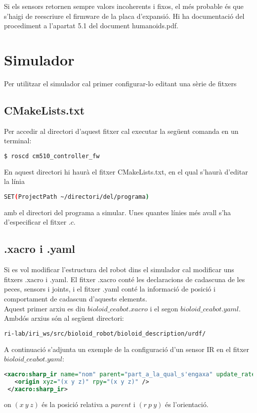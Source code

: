 \documentclass{article}
\begin{document}
Si els sensors retornen sempre valors incoherents i fixos, el més probable és que s'haigi de reescriure el firmware de la placa d'expansió. Hi ha documentació del procediment a l'apartat 5.1 del document humanoids.pdf.

\section{Simulador}
Per utilitzar el simulador cal primer configurar-lo editant una sèrie de 
fitxers
\subsection{CMakeLists.txt}
Per accedir al directori d'aquest fitxer cal executar la següent comanda en un terminal:
\begin{lstlisting}[language=bash]
$ roscd cm510_controller_fw
\end{lstlisting}
En aquest directori hi haurà el fitxer CMakeLists.txt, en el qual s'haurà d'editar la línia 
\begin{lstlisting}[language=bash]
SET(ProjectPath ~/directori/del/programa)
\end{lstlisting} amb el directori del programa a simular. Unes quantes línies més avall s'ha d'especificar el fitxer $.c$.
\subsection{.xacro i .yaml}
Si es vol modificar l'estructura del robot dins el simulador cal modificar uns fitxers .xacro i .yaml. El fitxer .xacro conté les declaracions de cadascuna de les peces, sensors i joints, i el fitxer .yaml conté la informació de posició i comportament de cadascun d'aquests elements. 
\\
Aquest primer arxiu es diu $bioloid\_ceabot.xacro$ i el segon $bioloid\_ceabot.yaml$. Ambdós arxius són al següent directori:
\begin{lstlisting}[language=bash]
ri-lab/iri_ws/src/bioloid_robot/bioloid_description/urdf/
\end{lstlisting}
A continuació s'adjunta un exemple de la configuració d'un sensor IR en el fitxer $bioloid\_ceabot.yaml$:

\begin{lstlisting}[language=xml]
 <xacro:sharp_ir name="nom" parent="part_a_la_qual_s'engaxa" update_rate="20" fov="0.05" min_range="0.1" max_range="0.8">
   <origin xyz="(x y z)" rpy="(x y z)" />
 </xacro:sharp_ir>
\end{lstlisting}
on $(x\ y\ z)$ és la posició relativa a $parent$ i $(r\ p\ y)$ és l'orientació. 
\end{document}
